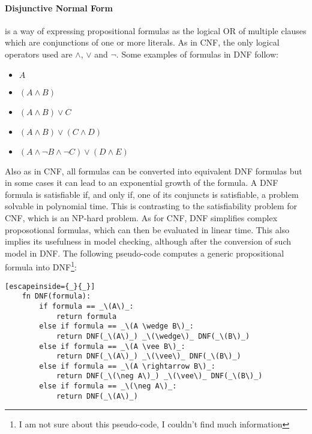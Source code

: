 \documentclass[11pt]{exam}
\begin{document}
\paragraph*{Disjunctive Normal Form}
is a way of expressing propositional formulas as the logical OR of multiple clauses which are conjunctions of one or more literals.
As in CNF, the only logical operators used are \(\wedge\), \(\vee\) and \(\neg\). Some examples of formulas in DNF follow:
\begin{itemize}
    \item \(A\)
    \item \((A \wedge B)\)
    \item \((A \wedge B) \vee C\)
    \item \((A \wedge B) \vee (C \wedge D)\)
    \item \((A \wedge \neg B \wedge \neg C) \vee (D \wedge E)\)
\end{itemize}
Also as in CNF, all formulas can be converted into equivalent DNF formulas but in some cases it can lead to an exponential growth of the formula.
A DNF formula is satisfiable if, and only if, one of its conjuncts is satisfiable, a problem solvable in polynomial time. This is contrasting to the satisfiability problem for CNF, which is an NP-hard problem.
As for CNF, DNF simplifies complex proposotional formulas, which can then be evaluated in linear time. This also implies its usefulness in model checking, although after the conversion of such model in DNF. 
The following pseudo-code computes a generic propositional formula into DNF\footnote[1]{I am not sure about this pseudo-code, I couldn't find much information}:
\begin{lstlisting}[escapeinside={_}{_}]
    fn DNF(formula):
        if formula == _\(A\)_:
            return formula
        else if formula == _\(A \wedge B\)_:
            return DNF(_\(A\)_) _\(\wedge\)_ DNF(_\(B\)_)
        else if formula == _\(A \vee B\)_:
            return DNF(_\(A\)_) _\(\vee\)_ DNF(_\(B\)_)
        else if formula == _\(A \rightarrow B\)_:
            return DNF(_\(\neg A\)_) _\(\vee\)_ DNF(_\(B\)_)
        else if formula == _\(\neg A\)_:
            return DNF(_\(A\)_)
\end{lstlisting}
\end{document}
